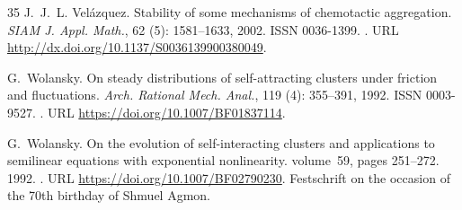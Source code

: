 \documentclass[11pt]{aims}
\theoremstyle{definition}
\numberwithin{equation}{section}
\begin{document}
\begin{thebibliography}{35}
J.~J.~L. Vel{\'a}zquez.
\newblock Stability of some mechanisms of chemotactic aggregation.
\newblock \emph{SIAM J. Appl. Math.}, 62 (5): 1581--1633,
  2002.
\newblock ISSN 0036-1399.
\newblock {}.
\newblock URL \url{http://dx.doi.org/10.1137/S0036139900380049}.

G.~Wolansky.
\newblock On steady distributions of self-attracting clusters under friction
  and fluctuations.
\newblock \emph{Arch. Rational Mech. Anal.}, 119 (4):
  355--391, 1992{}.
\newblock ISSN 0003-9527.
\newblock {}.
\newblock URL \url{https://doi.org/10.1007/BF01837114}.

G.~Wolansky.
\newblock On the evolution of self-interacting clusters and applications to
  semilinear equations with exponential nonlinearity.
\newblock volume~59, pages 251--272. 1992{}.
\newblock {}.
\newblock URL \url{https://doi.org/10.1007/BF02790230}.
\newblock Festschrift on the occasion of the 70th birthday of Shmuel Agmon.

\end{thebibliography}
\end{document}
